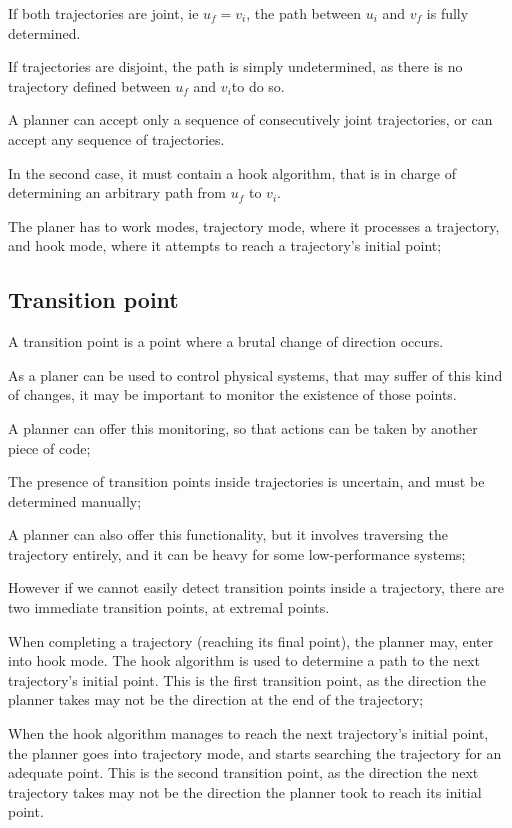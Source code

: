 If both trajectories are joint, ie $u_f = v_i$, the path between $u_i$ and $v_f$ is fully determined.

If trajectories are disjoint, the path is simply undetermined, as there is no trajectory defined between
$u_f$ and $ v_i$to do so.

A planner can accept only a sequence of consecutively joint trajectories, or can accept any sequence of trajectories.

In the second case, it must contain a hook algorithm, that is in charge of determining an arbitrary path
from $u_f$ to $ v_i$.

The planer has to work modes, trajectory mode, where it processes a trajectory, and hook mode, where it attempts
to reach a trajectory's initial point;


\subsection{Transition point}

A transition point is a point where a brutal change of direction occurs.

As a planer can be used to control physical systems, that may suffer of this kind of changes, it may be important to
monitor the existence of those points.

A planner can offer this monitoring, so that actions can be taken by another piece of code;

The presence of transition points inside trajectories is uncertain, and must be determined manually;

A planner can also offer this functionality, but it involves traversing the trajectory entirely, and it can be heavy
for some low-performance systems;

However if we cannot easily detect transition points inside a trajectory, there are two immediate transition points,
at extremal points.

When completing a trajectory (reaching its final point), the planner may, enter into hook mode.
The hook algorithm is used to determine a path to the next trajectory's initial point.
This is the first transition point, as the direction the planner takes may not be the direction at the end of the
trajectory;\newline

When the hook algorithm manages to reach the next trajectory's initial point, the planner goes into trajectory mode,
and starts searching the trajectory for an adequate point.
This is the second transition point, as the direction the next trajectory takes may not be the direction the planner
took to reach its initial point.\newline


